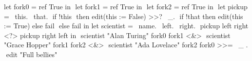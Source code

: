 \noindent
\begin{minipage}[r]{0.55\textwidth}

\begin{TASK}[
    numbers=right,
    caption={Dining philosophers problem with three computer scientists.},
    captionpos=b,
    label=lst:dining]
  let fork0 = ref True in $\label{lst:phil:fork0}$
  let fork1 = ref True in $\label{lst:phil:fork1}$
  let fork2 = ref True in $\label{lst:phil:fork2}$
  let pickup = \ this. \ that. $\label{lst:phil:this}$
    if !this $\label{lst:phil:deref}$
      then edit(this := False) >>? \ _. $\label{lst:phil:mark-used}$
        if !that then edit(this := True) else fail $\label{lst:phil:that}$
      else fail in
  let scientist = \ name. \ left. \ right. $\label{lst:phil:scientist}$
    pickup left right <?> pickup right left in $\label{lst:phil:pick}$
  scientist "Alan Turing" fork0 fork1 <&> $\label{lst:phil:scientist0}$
  scientist "Grace Hopper" fork1 fork2 <&> $\label{lst:phil:scientist1}$
  scientist "Ada Lovelace" fork2 fork0 >>= \ _ . $\label{lst:phil:scientist2}$
    edit "Full bellies"
\end{TASK}
\end{minipage}
\begin{minipage}[r]{0.05\textwidth}
  \
\end{minipage}
